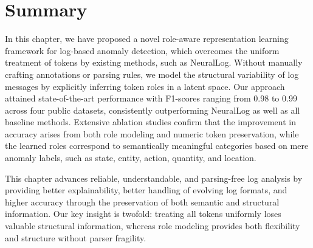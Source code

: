 \section{Summary}
In this chapter, we have proposed a novel role-aware representation learning framework for log-based anomaly detection, which overcomes the uniform treatment of tokens by existing methods, such as NeuralLog. Without manually crafting annotations or parsing rules, we model the structural variability of log messages by explicitly inferring token roles in a latent space. Our approach attained state-of-the-art performance with F1-scores ranging from 0.98 to 0.99 across four public datasets, consistently outperforming NeuralLog as well as all baseline methods. Extensive ablation studies confirm that the improvement in accuracy arises from both role modeling and numeric token preservation, while the learned roles correspond to semantically meaningful categories based on mere anomaly labels, such as state, entity, action, quantity, and location.

This chapter advances reliable, understandable, and parsing-free log analysis by providing better explainability, better handling of evolving log formats, and higher accuracy through the preservation of both semantic and structural information. Our key insight is twofold: treating all tokens uniformly loses valuable structural information, whereas role modeling provides both flexibility and structure without parser fragility.
